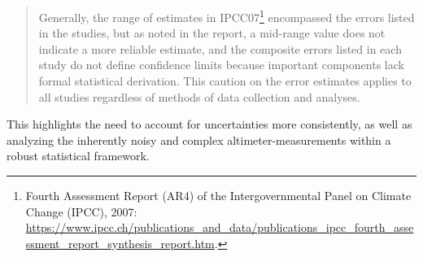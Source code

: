 \begin{quotation}
\noindent
Generally, the range of estimates in IPCC07\footnote{Fourth Assessment Report (AR4) of the Intergovernmental Panel on Climate Change (IPCC), 2007: \url{https://www.ipcc.ch/publications\_and\_data/publications\_ipcc\_fourth\_assessment\_report\_synthesis\_report.htm}.} encompassed the errors listed in the studies, but as noted in the report, a mid-range value does not indicate a more reliable estimate, and the composite errors listed in each study do not define confidence limits because important components lack formal statistical derivation. This caution on the error estimates applies to all studies regardless of methods of data collection and analyses.
\end{quotation}

This highlights the need to account for uncertainties more consistently, as well as analyzing the inherently noisy and complex altimeter-measurements within a robust statistical framework.


